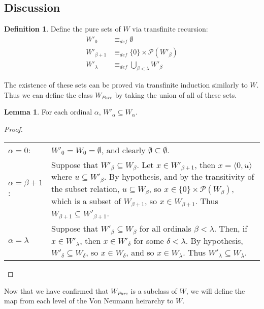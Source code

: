 \documentclass[11pt]{report}
\newcommand{\eqdef}{\equiv_\mathit{def}}
\newcommand{\pair}[2]{\langle #1,#2 \rangle}
\theoremstyle{definition}
\theoremstyle{theorem}
\theoremstyle{lemma}
\newtheorem{definition}{Definition}[section]
\newtheorem{lemma}[theorem]{Lemma}
\begin{document}
\subsection{Discussion}


\begin{definition}
Define the pure sets of $W$ via transfinite recursion:
\begin{align*}
W'_0 &\eqdef \emptyset\\
W'_{\beta+1} &\eqdef \{0\}\times\mathcal{P}(W'_\beta) \\
W'_\lambda &\eqdef \bigcup_{\beta < \lambda} W'_\beta
\end{align*}
\end{definition}
\noindent
The existence of these sets can be proved via transfinite induction similarly to $W$. Thus we can define the class $W_{\mathit{Pure}}$ by taking the union of all of these sets.
\begin{lemma} For each ordinal $\alpha$, $W'_\alpha \subseteq W_\alpha$.
  \begin{proof} \hspace{1mm}\\
    \begin{tabular}{p{20mm} p{137mm}}
      $\alpha = 0$: \rule{0pt}{4ex} &
      $W'_0 = W_0 = \emptyset$, and clearly $\emptyset \subseteq \emptyset$. \\
      $\alpha = \beta+1$: \rule{0pt}{4ex} &
      Suppose that $W'_\beta \subseteq W_\beta$. Let $x\in W'_{\beta+1}$, then $x = \pair{0}{u}$ where $u \subseteq W'_\beta$. By hypothesis, and by the transitivity of the subset relation, $u\subseteq W_\beta$, so $x\in\{0\}\times\mathcal{P}(W_\beta)$, which is a subset of $W_{\beta+1}$, so $x\in W_{\beta+1}$. Thus $W_{\beta+1} \subseteq W'_{\beta+1}$.
      \\
      $\alpha = \lambda$ \rule{0pt}{4ex} &
      Suppose that $W'_{\beta} \subseteq W_{\beta}$ for all ordinals $\beta < \lambda$. Then, if $x\in W'_\lambda$, then $x\in W'_\delta$ for some $\delta < \lambda$. By hypothesis, $W'_\delta \subseteq W_\delta$, so $x\in W_\delta$, and so $x\in W_\lambda$. Thus $W'_\lambda\subseteq W_\lambda$.
    \end{tabular}
  \end{proof}
\end{lemma}
\noindent
Now that we have confirmed that $W_{\mathit{Pure}}$ is a subclass of $W$, we will define the map from each level of the Von Neumann heirarchy to $W$.
\end{document}
